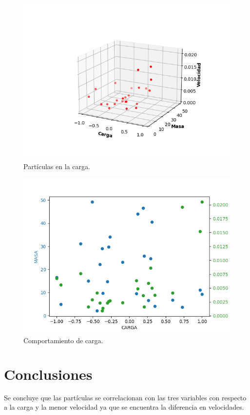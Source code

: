 \documentclass{article}
\begin{document}
\begin{figure}
    \centering
    \includegraphics[width=200mm]{Figure_1.png}
    \caption{Partículas en la carga.}
    \label{figure}
\end{figure}
\begin{figure}
    \centering
    \includegraphics[width=180mm]{Figure_2.png}
    \caption{Comportamiento de carga.}
    \label{figure}
\end{figure}

\newpage
\section{Conclusiones}\label{}
Se concluye que las partículas se correlacionan con las tres variables con respecto a la carga y la menor velocidad ya que se encuentra la diferencia en velocidades.


\end{document}
